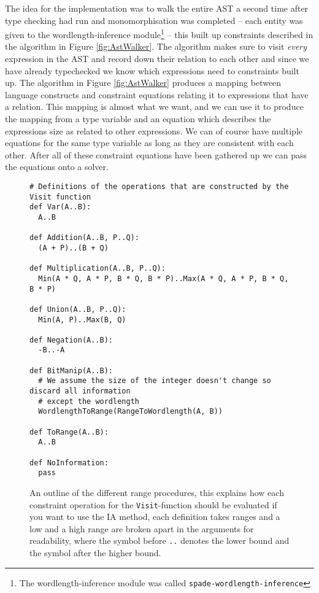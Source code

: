 The idea for the implementation was to walk the entire AST a second time after type checking had run and monomorphisation was completed -- each entity was given to the wordlength-inference module\cprotect\footnote{The wordlength-inference module was called \verb+spade-wordlength-inference+} -- this built up constraints described in the algorithm in Figure \ref{fig:AstWalker}. The algorithm makes sure to visit \textit{every} expression in the AST and record down their relation to each other and since we have already typechecked we know which expressions need to constraints built up. The algorithm in Figure \ref{fig:AstWalker} produces a mapping between language constructs and constraint equations relating it to expressions that have a relation. This mapping is almost what we want, and we can use it to produce the mapping from a type variable and an equation which describes the expressions size as related to other expressions. We can of course have multiple equations for the same type variable as long as they are consistent with each other. After all of these constraint equations have been gathered up we can pass the equations onto a solver. 

\begin{figure}[h!]
\begin{verbatim}
# Definitions of the operations that are constructed by the Visit function
def Var(A..B):
  A..B

def Addition(A..B, P..Q):
  (A + P)..(B + Q)

def Multiplication(A..B, P..Q):
  Min(A * Q, A * P, B * Q, B * P)..Max(A * Q, A * P, B * Q, B * P)

def Union(A..B, P..Q):
  Min(A, P)..Max(B, Q)

def Negation(A..B):
  -B..-A

def BitManip(A..B):
  # We assume the size of the integer doesn't change so discard all information
  # except the wordlength
  WordlengthToRange(RangeToWordlength(A, B))

def ToRange(A..B):
  A..B

def NoInformation:
  pass

\end{verbatim}
  \cprotect\caption{An outline of the different range procedures, this explains how each constraint operation for the \verb+Visit+-function should be evaluated if you want to use the IA method, each definition takes ranges and a low and a high range are broken apart in the arguments for readability, where the symbol before \verb+..+ denotes the lower bound and the symbol after the higher bound.}
\label{fig:IaInference}
\end{figure}


